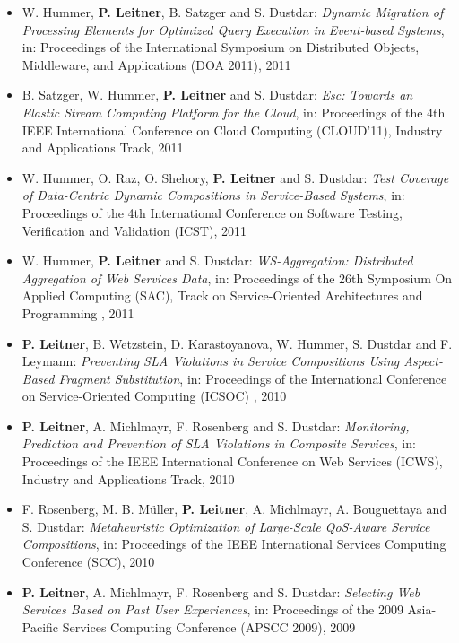 \documentclass[paper=letter,fontsize=11pt]{scrartcl} %
\begin{document}
\begin{itemize}
\emph{Distributed Continuous Queries Over Web Service Event Streams}, in: Proceedings of the 7th International Conference on Next Generation Web Services Practices
(NWeSP'11), 2011
\item W. Hummer, \textbf{P. Leitner}, B. Satzger and S. Dustdar:
\emph{Dynamic Migration of Processing Elements for Optimized Query Execution in
Event-based Systems}, in: Proceedings of the International Symposium on Distributed
Objects, Middleware, and Applications (DOA 2011), 2011
\item B. Satzger, W. Hummer, \textbf{P. Leitner} and S. Dustdar:
\emph{Esc: Towards an Elastic Stream Computing Platform for the Cloud},
in: Proceedings of the 4th IEEE International Conference on Cloud Computing (CLOUD'11), Industry and Applications Track, 2011
\item W. Hummer, O. Raz, O. Shehory, \textbf{P. Leitner} and S. Dustdar:
\emph{Test Coverage of Data-Centric Dynamic Compositions in Service-Based
Systems}, in: Proceedings of the 4th International Conference on Software Testing,
Verification and Validation (ICST), 2011
\item W. Hummer, \textbf{P. Leitner} and S. Dustdar: \emph{WS-Aggregation: Distributed Aggregation of Web Services Data}, in: Proceedings of the 26th Symposium On Applied Computing (SAC), Track on Service-Oriented Architectures and Programming , 2011
\item \textbf{P. Leitner}, B. Wetzstein, D. Karastoyanova, W. Hummer, S. Dustdar and F. Leymann: \emph{Preventing SLA Violations in Service Compositions Using Aspect-Based Fragment Substitution}, in: Proceedings of the International Conference on Service-Oriented Computing (ICSOC) , 2010
\item \textbf{P. Leitner}, A. Michlmayr, F. Rosenberg and S. Dustdar: \emph{Monitoring, Prediction and Prevention of SLA Violations in Composite Services}, in: Proceedings of the IEEE International Conference on Web Services (ICWS), Industry and Applications Track, 2010
\item F. Rosenberg, M. B. M\"uller, \textbf{P. Leitner}, A. Michlmayr, A. Bouguettaya
and S. Dustdar: \emph{Metaheuristic Optimization of Large-Scale QoS-Aware Service Compositions}, in: Proceedings of the IEEE International Services Computing Conference (SCC), 2010
\item \textbf{P. Leitner}, A. Michlmayr, F. Rosenberg and S. Dustdar: \emph{Selecting Web Services Based on Past User Experiences}, in: Proceedings of the 2009 Asia-Pacific Services Computing Conference (APSCC 2009), 2009

\end{itemize}
\end{document}
